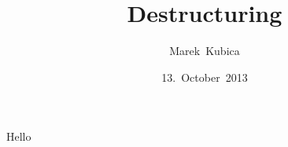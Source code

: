 \documentclass{beamer}
\title{Destructuring}
\author{Marek~Kubica}
\date{13.~October~2013}
\institute{Clojure Workshop}
\begin{document}
{
  \frame{\titlepage}
}

\begin{frame}
  Hello
\end{frame}
\end{document}
